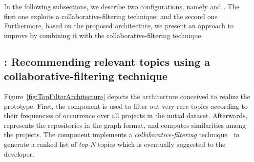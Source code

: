 In the following subsections, we describe two \TF configurations, namely \TFa and \TFb. The first one exploits a collaborative-filtering technique; and the second one  %
Furthermore, based on the proposed architecture, we present an approach to improve \MNB by combining it with the collaborative-filtering technique. %








\subsection{\TFa: Recommending relevant topics using a collaborative-filtering technique} \label{sec:CFRecommendation}



Figure~\ref{fig:TopFilterArchitecture} depicts the architecture conceived to realize the \TF prototype. First, the  component is used to filter out very rare topics according to their frequencies of occurrence over all projects in the initial dataset. Afterwards,  represents the repositories in the graph format, and  computes similarities among the projects. The  component implements a \emph{collaborative-filtering} technique~\cite{Aggarwal2016,Zhao:2010:UCR:1748610.1749278,NGUYEN2020110460} %
to generate a ranked list of \emph{top-N} topics which %
is eventually suggested to the developer.


